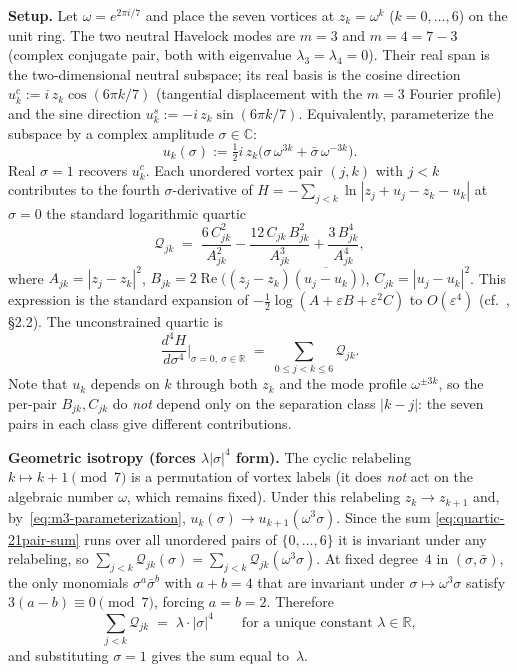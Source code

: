 \textbf{Setup.}
Let $\omega = e^{2\pi i/7}$ and place the seven vortices
at $z_k = \omega^k$ ($k = 0, \ldots, 6$) on the unit ring.
The two neutral Havelock modes are $m = 3$ and $m = 4 = 7 - 3$
(complex conjugate pair, both with eigenvalue $\lambda_3 =
\lambda_4 = 0$).  Their real span is the two-dimensional
neutral subspace; its real basis is the cosine direction
$u_k^c := i\,z_k \cos(6\pi k/7)$ (tangential displacement
with the $m = 3$ Fourier profile) and the sine direction
$u_k^s := -i\,z_k \sin(6\pi k/7)$.  Equivalently,
parameterize the subspace by a complex amplitude $\sigma
\in \mathbb{C}$:
\begin{equation}\label{eq:m3-parameterization}
  u_k(\sigma) := \tfrac{1}{2}i\,z_k\bigl(\sigma\,\omega^{3k}
    + \bar\sigma\,\omega^{-3k}\bigr).
\end{equation}
Real $\sigma = 1$ recovers $u_k^c$.  Each unordered vortex
pair $(j, k)$ with $j < k$ contributes to the fourth
$\sigma$-derivative of $H = -\sum_{j<k} \ln|z_j + u_j -
z_k - u_k|$ at $\sigma = 0$ the standard logarithmic
quartic
\begin{equation}\label{eq:per-pair-quartic}
  \mathcal{Q}_{jk}
  \;=\; \frac{6\,C_{jk}^2}{A_{jk}^2}
    - \frac{12\,C_{jk}\,B_{jk}^2}{A_{jk}^3}
    + \frac{3\,B_{jk}^4}{A_{jk}^4},
\end{equation}
where $A_{jk} = |z_j - z_k|^2$, $B_{jk} = 2\operatorname{Re}\bigl(
(z_j - z_k)\overline{(u_j - u_k)}\bigr)$, $C_{jk} = |u_j - u_k|^2$.
This expression is the standard expansion of
$-\tfrac12 \log(A + \varepsilon B + \varepsilon^2 C)$ to
$O(\varepsilon^4)$ (cf.\ \citealt{Newton2001}, \S2.2).
The unconstrained quartic is
\begin{equation}\label{eq:quartic-21pair-sum}
  \frac{d^4 H}{d\sigma^4}\bigg|_{\sigma = 0,\ \sigma\in\mathbb{R}}
  \;=\; \sum_{0\le j<k\le 6} \mathcal{Q}_{jk}.
\end{equation}
Note that $u_k$ depends on $k$ through both $z_k$ and the
mode profile $\omega^{\pm 3k}$, so the per-pair $B_{jk}, C_{jk}$
do \emph{not} depend only on the separation class $|k - j|$:
the seven pairs in each class give different contributions.

\textbf{Geometric isotropy (forces $\lambda |\sigma|^4$ form).}
The cyclic relabeling $k \mapsto k + 1 \pmod 7$ is a
permutation of vortex labels (it does \emph{not} act on the
algebraic number $\omega$, which remains fixed).  Under this
relabeling $z_k \to z_{k+1}$ and, by~\eqref{eq:m3-parameterization},
$u_k(\sigma) \to u_{k+1}(\omega^3 \sigma)$.  Since the sum
\eqref{eq:quartic-21pair-sum} runs over all unordered pairs
of $\{0, \ldots, 6\}$ it is invariant under any relabeling,
so $\sum_{j<k}\mathcal{Q}_{jk}(\sigma) =
\sum_{j<k}\mathcal{Q}_{jk}(\omega^3 \sigma)$.
At fixed degree~$4$ in $(\sigma, \bar\sigma)$, the only
monomials $\sigma^a\bar\sigma^b$ with $a + b = 4$ that are
invariant under $\sigma \mapsto \omega^3 \sigma$ satisfy
$3(a-b) \equiv 0 \pmod 7$, forcing $a = b = 2$.  Therefore
\begin{equation}\label{eq:isotropic-quartic}
  \sum_{j<k} \mathcal{Q}_{jk}
  \;=\; \lambda \cdot |\sigma|^4
  \qquad \text{for a unique constant } \lambda \in \mathbb{R},
\end{equation}
and substituting $\sigma = 1$ gives the sum equal to~$\lambda$.

